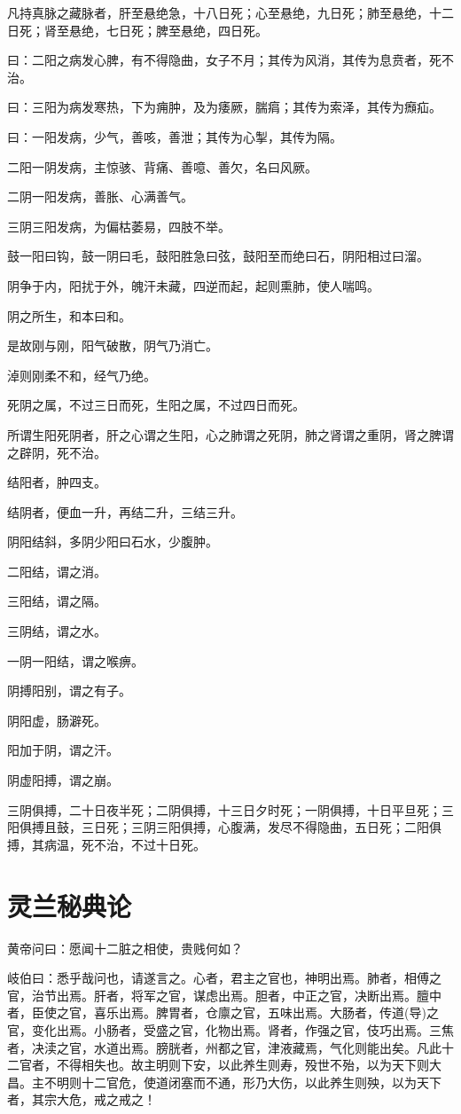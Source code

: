 \documentclass{article}%
\begin{document}
凡持真脉之藏脉者，肝至悬绝急，十八日死；心至悬绝，九日死；肺至悬绝，十二日死；肾至悬绝，七日死；脾至悬绝，四日死。

曰：二阳之病发心脾，有不得隐曲，女子不月；其传为风消，其传为息贲者，死不治。

曰：三阳为病发寒热，下为痈肿，及为痿厥，腨㾓；其传为索泽，其传为㿗疝。

曰：一阳发病，少气，善咳，善泄；其传为心掣，其传为隔。

二阳一阴发病，主惊骇、背痛、善噫、善欠，名曰风厥。

二阴一阳发病，善胀、心满善气。

三阴三阳发病，为偏枯萎易，四肢不举。

鼓一阳曰钩，鼓一阴曰毛，鼓阳胜急曰弦，鼓阳至而绝曰石，阴阳相过曰溜。

阴争于内，阳扰于外，魄汗未藏，四逆而起，起则熏肺，使人喘鸣。

阴之所生，和本曰和。

是故刚与刚，阳气破散，阴气乃消亡。

淖则刚柔不和，经气乃绝。

死阴之属，不过三日而死，生阳之属，不过四日而死。

所谓生阳死阴者，肝之心谓之生阳，心之肺谓之死阴，肺之肾谓之重阴，肾之脾谓之辟阴，死不治。

结阳者，肿四支。

结阴者，便血一升，再结二升，三结三升。

阴阳结斜，多阴少阳曰石水，少腹肿。

二阳结，谓之消。

三阳结，谓之隔。

三阴结，谓之水。

一阴一阳结，谓之喉痹。

阴搏阳别，谓之有子。

阴阳虚，肠澼死。

阳加于阴，谓之汗。

阴虚阳搏，谓之崩。

三阴俱搏，二十日夜半死；二阴俱搏，十三日夕时死；一阴俱搏，十日平旦死；三阳俱搏且鼓，三日死；三阴三阳俱搏，心腹满，发尽不得隐曲，五日死；二阳俱搏，其病温，死不治，不过十日死。
\section{灵兰秘典论}
黄帝问曰：愿闻十二脏之相使，贵贱何如？

岐伯曰：悉乎哉问也，请遂言之。心者，君主之官也，神明出焉。肺者，相傅之官，治节出焉。肝者，将军之官，谋虑出焉。胆者，中正之官，决断出焉。膻中者，臣使之官，喜乐出焉。脾胃者，仓廪之官，五味出焉。大肠者，传道(导)之官，变化出焉。小肠者，受盛之官，化物出焉。肾者，作强之官，伎巧出焉。三焦者，决渎之官，水道出焉。膀胱者，州都之官，津液藏焉，气化则能出矣。凡此十二官者，不得相失也。故主明则下安，以此养生则寿，殁世不殆，以为天下则大昌。主不明则十二官危，使道闭塞而不通，形乃大伤，以此养生则殃，以为天下者，其宗大危，戒之戒之！
\end{document}
